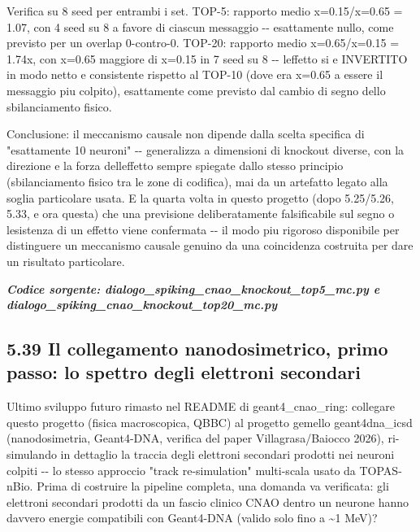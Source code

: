 \documentclass[
  italian,
]{article}
\begin{document}
Verifica su 8 seed per entrambi i set. TOP-5: rapporto medio x=0.15/x=0.65 = 1.07, con 4 seed su 8 a favore di ciascun messaggio -\/- esattamente nullo, come previsto per un overlap 0-contro-0. TOP-20: rapporto medio x=0.65/x=0.15 = 1.74x, con x=0.65 maggiore di x=0.15 in 7 seed su 8 -\/- l\textquotesingle effetto si e\textquotesingle{} INVERTITO in modo netto e consistente rispetto al TOP-10 (dove era x=0.65 a essere il messaggio piu\textquotesingle{} colpito), esattamente come previsto dal cambio di segno dello sbilanciamento fisico.

Conclusione: il meccanismo causale non dipende dalla scelta specifica di "esattamente 10 neuroni" -\/- generalizza a dimensioni di knockout diverse, con la direzione e la forza dell\textquotesingle effetto sempre spiegate dallo stesso principio (sbilanciamento fisico tra le zone di codifica), mai da un artefatto legato alla soglia particolare usata. E\textquotesingle{} la quarta volta in questo progetto (dopo 5.25/5.26, 5.33, e ora questa) che una previsione deliberatamente falsificabile sul segno o l\textquotesingle esistenza di un effetto viene confermata -\/- il modo piu\textquotesingle{} rigoroso disponibile per distinguere un meccanismo causale genuino da una coincidenza costruita per dare un risultato particolare.

\textit{\textbf{Codice sorgente: dialogo\_\allowbreak{}spiking\_\allowbreak{}cnao\_\allowbreak{}knockout\_\allowbreak{}top5\_\allowbreak{}mc.py e dialogo\_\allowbreak{}spiking\_\allowbreak{}cnao\_\allowbreak{}knockout\_\allowbreak{}top20\_\allowbreak{}mc.py}}



\subsection{5.39 Il collegamento nanodosimetrico, primo passo: lo spettro degli elettroni secondari}\label{il-collegamento-nanodosimetrico-primo-passo-lo-spettro-degli-elettroni-secondari}

Ultimo sviluppo futuro rimasto nel README di geant4\_\allowbreak{}cnao\_\allowbreak{}ring: collegare questo progetto (fisica macroscopica, QBBC) al progetto gemello geant4dna\_\allowbreak{}icsd (nanodosimetria, Geant4-DNA, verifica del paper Villagrasa/Baiocco 2026), ri-simulando in dettaglio la traccia degli elettroni secondari prodotti nei neuroni colpiti -\/- lo stesso approccio "track re-simulation" multi-scala usato da TOPAS-nBio. Prima di costruire la pipeline completa, una domanda va verificata: gli elettroni secondari prodotti da un fascio clinico CNAO dentro un neurone hanno davvero energie compatibili con Geant4-DNA (valido solo fino a \textasciitilde1 MeV)?
\end{document}
